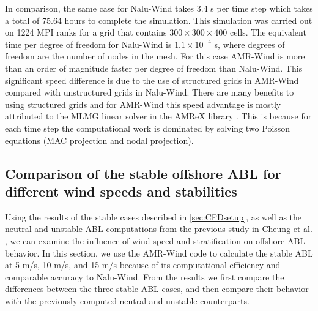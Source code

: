 In comparison, the same case for Nalu-Wind takes 3.4 s per time step which
takes a total of 75.64 hours to complete the simulation. This simulation was carried out
on 1224 MPI ranks for a grid that contains $300\times 300 \times 400$ cells. The equivalent
time per degree of freedom for Nalu-Wind is $1.1 \times 10^{-4}$ s, where degrees of freedom
are the number of nodes in the mesh. For this case AMR-Wind is more than an order of magnitude
faster per degree of freedom than Nalu-Wind. This significant speed difference is due to the use
of structured grids in AMR-Wind compared with unstructured grids in Nalu-Wind. There are many 
benefits to using structured grids and for AMR-Wind this speed advantage is mostly attributed
 to the MLMG linear solver in the AMReX library \cite{AMReX_JOSS}. This is because for each 
 time step the computational work is dominated by solving two Poisson equations (MAC projection and nodal projection). 


\subsection{Comparison of the stable offshore ABL for different wind speeds and stabilities}

Using the results of the stable cases described in \ref{sec:CFDsetup},
as well as the neutral and unstable ABL computations from the previous
study in Cheung et al. \cite{cheung2020large}, we can examine the
influence of wind speed and stratification on offshore ABL behavior.
In this section, we use the AMR-Wind code to calculate the stable ABL
at 5 m/s, 10 m/s, and 15 m/s because of its computational efficiency
and comparable accuracy to Nalu-Wind.  From the results we first
compare the differences between the three stable ABL cases, and then
compare their behavior with the previously computed neutral and
unstable counterparts.

